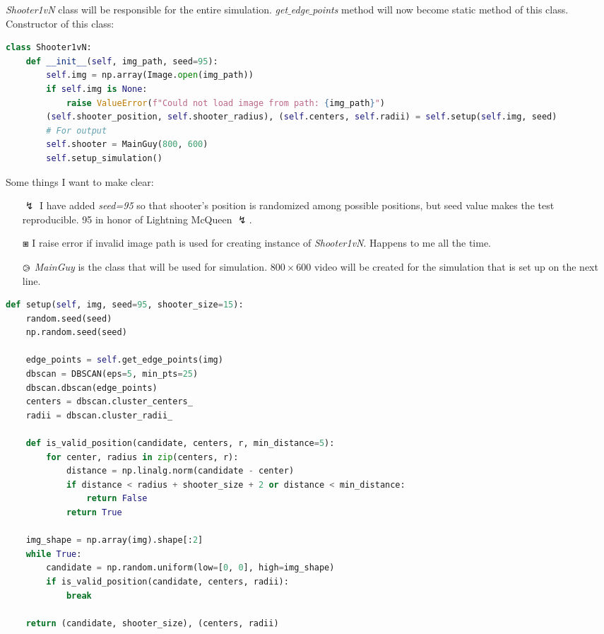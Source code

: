 \documentclass{article}
\begin{document}
	\textit{Shooter1vN} class will be responsible for the entire simulation. \textit{get$\_$edge$\_$points} method will now become static method of this class. Constructor of this class:
	
\begin{lstlisting}[language=python]
class Shooter1vN:
	def __init__(self, img_path, seed=95):
		self.img = np.array(Image.open(img_path))
		if self.img is None:
			raise ValueError(f"Could not load image from path: {img_path}")
		(self.shooter_position, self.shooter_radius), (self.centers, self.radii) = self.setup(self.img, seed)
		# For output
		self.shooter = MainGuy(800, 600)
		self.setup_simulation()
\end{lstlisting}

	Some things I want to make clear:
	\begin{enumerate}
		\item[$\lightning$] I have added \textit{seed=95} so that shooter's position is randomized among possible positions, but seed value makes the test reproducible. 95 in honor of Lightning McQueen $\lightning$.
		\item[$\boxast$] I raise error if invalid image path is used for creating instance of \textit{Shooter1vN}. Happens to me all the time.
		\item[$\varogreaterthan$] \textit{MainGuy} is the class that will be used for simulation. $800 \times 600$ video will be created for the simulation that is set up on the next line.
	\end{enumerate}

\begin{lstlisting}[language=python]
def setup(self, img, seed=95, shooter_size=15):
	random.seed(seed)
	np.random.seed(seed)
	
	edge_points = self.get_edge_points(img)
	dbscan = DBSCAN(eps=5, min_pts=25)
	dbscan.dbscan(edge_points)
	centers = dbscan.cluster_centers_
	radii = dbscan.cluster_radii_
	
	def is_valid_position(candidate, centers, r, min_distance=5):
		for center, radius in zip(centers, r):
			distance = np.linalg.norm(candidate - center)
			if distance < radius + shooter_size + 2 or distance < min_distance:
				return False
			return True
	
	img_shape = np.array(img).shape[:2]
	while True:
		candidate = np.random.uniform(low=[0, 0], high=img_shape)
		if is_valid_position(candidate, centers, radii):
			break
	
	return (candidate, shooter_size), (centers, radii)
\end{lstlisting}
	
\end{document}
